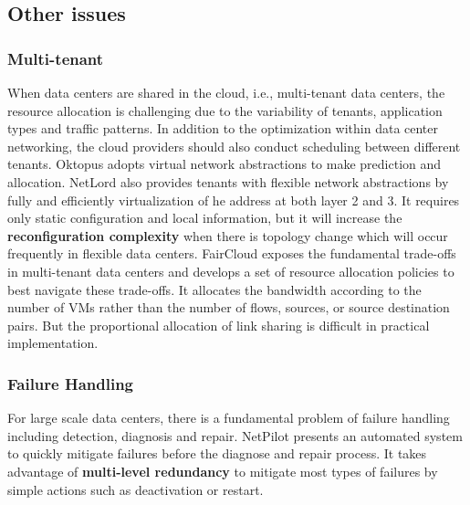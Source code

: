 \documentclass[journal,onecolumn,11pt]{IEEEtran}
\begin{document}

\subsection{Other issues}

\subsubsection{Multi-tenant}

When data centers are shared in the cloud, i.e., multi-tenant data centers, the resource allocation is challenging due to the variability of tenants, application types and traffic patterns. In addition to the optimization within data center networking, the cloud providers should also conduct scheduling between different tenants. Oktopus \cite{Ballani:2011:TPD:2018436.2018465} adopts virtual network abstractions to make prediction and allocation. NetLord \cite{Mudigonda:2011:NSM:2018436.2018444} also provides tenants with flexible network abstractions by fully and efficiently virtualization of he address at both layer 2 and 3. It requires only static configuration and local information, but it will increase the \textbf{reconfiguration complexity} when there is topology change which will occur frequently in flexible data centers. FairCloud \cite{Popa:2011:FSN:2070562.2070584} exposes the fundamental trade-offs in multi-tenant data centers and develops a set of resource allocation policies to best navigate these trade-offs. It allocates the bandwidth according to the number of VMs rather than the number of flows, sources, or source destination pairs. But the proportional allocation of link sharing is difficult in practical implementation.

\subsubsection{Failure Handling}

For large scale data centers, there is a fundamental problem of failure handling including detection, diagnosis and repair. NetPilot \cite{Wu:2012:NAD:2342356.2342438} presents an automated system to quickly mitigate failures before the diagnose and repair process. It takes advantage of \textbf{multi-level redundancy} to mitigate most types of failures by simple actions such as deactivation or restart.
\end{document}
